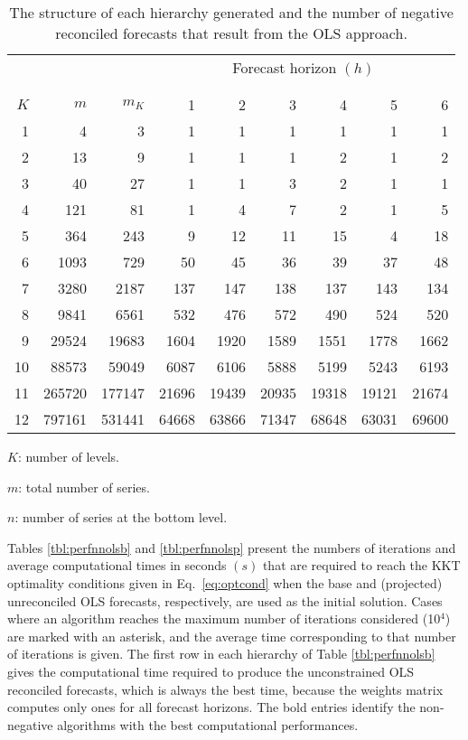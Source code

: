 \documentclass[11pt]{article}
\newcommand{\0}{\phantom{0}}
\begin{document}
\begin{table}[ht]
	\caption{The structure of each hierarchy generated and the number of negative reconciled forecasts that result from the OLS approach.}
	\label{tbl:negstrols}
	\centering
	\begin{threeparttable}
		\begin{tabular}{rrrrrrrrr}
			\toprule
			& & & \multicolumn{6}{c}{Forecast horizon $(h)$}\\[-0.3cm]\\\cline{4-9}\\[-0.3cm]
			$K$ & $m$ & $m_{K}$ & 1 & 2 & 3 & 4 & 5 & 6\\ 
			\midrule
			1 & 4 & 3 & 1 & 1 & 1 & 1 & 1 & 1 \\
			2 & 13 & 9 & 1 & 1 & 1 & 2 & 1 & 2\\
			3 & 40 & 27 & 1 & 1 & 3 & 2 & 1 & 1\\
			4 & 121 & 81 & 1 & 4 & 7 & 2 & 1 & 5 \\
			5 & 364 & 243 & 9 & 12 & 11 & 15 & 4 & 18 \\
			6 & 1093 & 729 & 50 & 45 & 36 & 39 & 37 & 48 \\
			7 & 3280 & 2187 & 137 & 147 & 138 & 137 & 143 & 134 \\
			8 & 9841 & 6561 & 532 & 476 & 572 & 490 & 524 & 520 \\
			9 & 29524 & 19683 & 1604 & 1920 & 1589 & 1551 & 1778 & 1662 \\
			10 & 88573 & 59049 & 6087 & 6106 & 5888 & 5199 & 5243 & 6193 \\
			11 & 265720 & 177147 & 21696 & 19439 & 20935 & 19318 & 19121 & 21674 \\
			12 & 797161 & 531441 & 64668 & 63866 & 71347 & 68648 & 63031 & 69600 \\
			\bottomrule
		\end{tabular}
		\begin{tablenotes}
			\item [] $K$: number of levels.
			\item [] $m$: total number of series.
			\item [] $n$: number of series at the bottom level.	
		\end{tablenotes}
	\end{threeparttable}
\end{table}

Tables \ref{tbl:perfnnolsb} and \ref{tbl:perfnnolsp} present the numbers of iterations and average computational times in seconds $(s)$ that are required to reach the KKT optimality conditions given in Eq.\ \eqref{eq:optcond} when the base and (projected) unreconciled OLS forecasts, respectively, are used as the initial solution. Cases where an algorithm reaches the maximum number of iterations considered (10$^{4}$) are marked with an asterisk, and the average time corresponding to that number of iterations is given. The first row in each hierarchy of Table \ref{tbl:perfnnolsb} gives the computational time required to produce the unconstrained OLS reconciled forecasts, which is always the best time, because the weights matrix computes only ones for all forecast horizons. The bold entries identify the non-negative algorithms with the best computational performances. 
\end{document}
